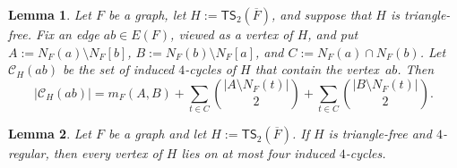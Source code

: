 \documentclass[10pt,a4paper]{amsart}
\newtheorem{lemma}{Lemma}
\newcommand{\TSsym}{\mathsf{TS}}
\begin{document}
\begin{lemma}
\label{lem:ts2-local-c4-count}
Let $F$ be a graph, let $H:=\TSsym_2(\overline{F})$, and suppose that $H$ is triangle-free.
Fix an edge $ab\in E(F)$, viewed as a vertex of $H$, and put $A:=N_F(a)\setminus N_F[b]$, $B:=N_F(b)\setminus N_F[a]$, and $C:=N_F(a)\cap N_F(b)$.
Let $\mathcal C_H(ab)$ be the set of induced $4$-cycles of $H$ that contain the vertex~$ab$.
Then
\[
|\mathcal C_H(ab)|
=m_F(A,B)
+\sum_{t\in C}\binom{|A\setminus N_F(t)|}{2}
+\sum_{t\in C}\binom{|B\setminus N_F(t)|}{2}.
\]
\end{lemma}

\begin{lemma}
\label{lem:ts2-four-regular-c4-cap}
Let $F$ be a graph and let $H:=\TSsym_2(\overline{F})$.
If $H$ is triangle-free and $4$-regular, then every vertex of $H$ lies on at most four induced $4$-cycles.
\end{lemma}
\end{document}
